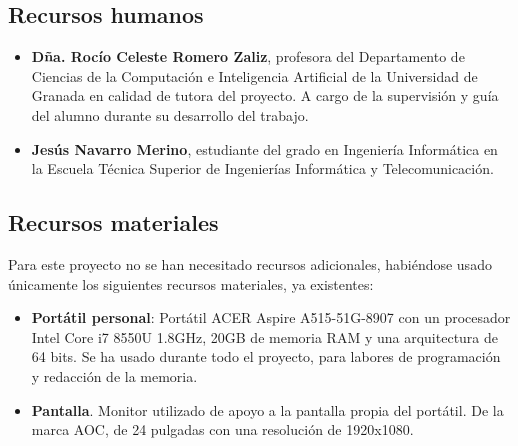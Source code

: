 \subsection{Recursos humanos}
\begin{itemize}
    \item \textbf{Dña. Rocío Celeste Romero Zaliz}, profesora del Departamento de Ciencias de la Computación e Inteligencia Artificial de la Universidad de Granada en calidad de tutora del proyecto. A cargo de la supervisión y guía del alumno durante su desarrollo del trabajo.
    \item \textbf{Jesús Navarro Merino}, estudiante del grado en Ingeniería Informática en la Escuela Técnica Superior de Ingenierías Informática y Telecomunicación.
\end{itemize}


\subsection{Recursos materiales}
Para este proyecto no se han necesitado recursos adicionales, habiéndose usado únicamente los siguientes recursos materiales, ya existentes: 
\begin{itemize}
    \item \textbf{Portátil personal}: Portátil ACER Aspire A515-51G-8907 con un procesador Intel Core i7 8550U 1.8GHz, 20GB de memoria RAM y una arquitectura de 64 bits. Se ha usado durante todo el proyecto, para labores de programación y redacción de la memoria.
    \item \textbf{Pantalla}. Monitor utilizado de apoyo a la pantalla propia del portátil. De la marca AOC, de 24 pulgadas con una resolución de 1920x1080.
\end{itemize}


